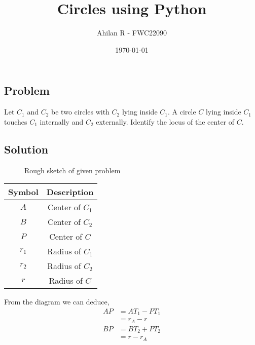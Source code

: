 \documentclass[journal,12pt,twocolumn]{IEEEtran}
\title{Circles using Python}
\author{Ahilan R - FWC22090}
\date{\today}
\begin{document}
\maketitle

\subsection*{\textbf{Problem}}
Let $C_1$ and $C_2$ be two circles with $C_2$ lying inside $C_1$. A circle $C$ lying inside $C_1$ touches $C_1$ internally and $C_2$ externally. Identify the locus of the center of $C$. 

\subsection*{\textbf{Solution}}

\begin{figure}[h]
\centering
\def\figwidth{\linewidth}
\def\figheight{0.35\textheight} %

\label{fig:rough}
\caption{Rough sketch of given problem}
\end{figure}

\begin{table}[h]
	\small
	\centering
	\begin{tabular}[20pt]{|c|c|}
		\hline
		\textbf{Symbol}&\textbf{Description}\\
		\hline
			$A$&Center of $C_1$\\
		\hline
			$B$&Center of $C_2$\\
		\hline
			$P$&Center of $C$\\
		\hline
			$r_1$&Radius of $C_1$\\
		\hline 
			$r_2$&Radius of $C_2$\\
		\hline 
			$r$&Radius of $C$\\
		\hline 
	\end{tabular}
\end{table}

From the diagram we can deduce, 
\begin{equation}
\begin{split}
	AP &= AT_1 - PT_1 \\
	&= r_A - r \label{eq:1}
\end{split} 
\end{equation} 
\begin{equation}
\begin{split}
	BP &= BT_2 + PT_2 \\
	&= r - r_A \label{eq:2}
\end{split} 
\end{equation} 
\end{document}
